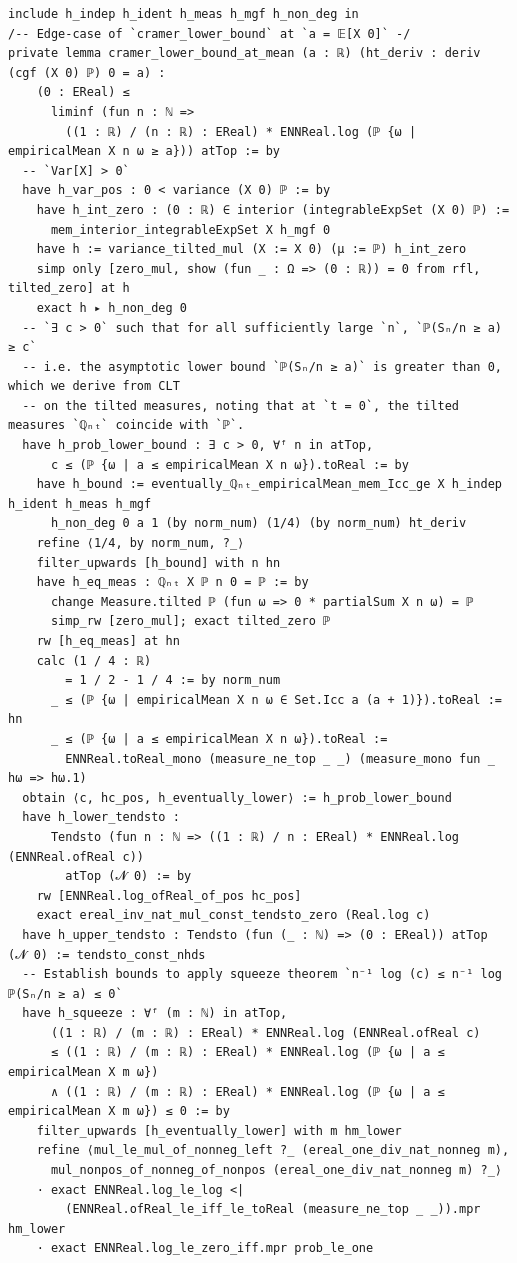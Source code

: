 \begin{lstlisting}
include h_indep h_ident h_meas h_mgf h_non_deg in
/-- Edge-case of `cramer_lower_bound` at `a = 𝔼[X 0]` -/
private lemma cramer_lower_bound_at_mean (a : ℝ) (ht_deriv : deriv (cgf (X 0) ℙ) 0 = a) :
    (0 : EReal) ≤
      liminf (fun n : ℕ =>
        ((1 : ℝ) / (n : ℝ) : EReal) * ENNReal.log (ℙ {ω | empiricalMean X n ω ≥ a})) atTop := by
  -- `Var[X] > 0`
  have h_var_pos : 0 < variance (X 0) ℙ := by
    have h_int_zero : (0 : ℝ) ∈ interior (integrableExpSet (X 0) ℙ) :=
      mem_interior_integrableExpSet X h_mgf 0
    have h := variance_tilted_mul (X := X 0) (μ := ℙ) h_int_zero
    simp only [zero_mul, show (fun _ : Ω => (0 : ℝ)) = 0 from rfl, tilted_zero] at h
    exact h ▸ h_non_deg 0
  -- `∃ c > 0` such that for all sufficiently large `n`, `ℙ(Sₙ/n ≥ a) ≥ c`
  -- i.e. the asymptotic lower bound `ℙ(Sₙ/n ≥ a)` is greater than 0, which we derive from CLT
  -- on the tilted measures, noting that at `t = 0`, the tilted measures `ℚₙₜ` coincide with `ℙ`.
  have h_prob_lower_bound : ∃ c > 0, ∀ᶠ n in atTop,
      c ≤ (ℙ {ω | a ≤ empiricalMean X n ω}).toReal := by
    have h_bound := eventually_ℚₙₜ_empiricalMean_mem_Icc_ge X h_indep h_ident h_meas h_mgf
      h_non_deg 0 a 1 (by norm_num) (1/4) (by norm_num) ht_deriv
    refine ⟨1/4, by norm_num, ?_⟩
    filter_upwards [h_bound] with n hn
    have h_eq_meas : ℚₙₜ X ℙ n 0 = ℙ := by
      change Measure.tilted ℙ (fun ω => 0 * partialSum X n ω) = ℙ
      simp_rw [zero_mul]; exact tilted_zero ℙ
    rw [h_eq_meas] at hn
    calc (1 / 4 : ℝ)
        = 1 / 2 - 1 / 4 := by norm_num
      _ ≤ (ℙ {ω | empiricalMean X n ω ∈ Set.Icc a (a + 1)}).toReal := hn
      _ ≤ (ℙ {ω | a ≤ empiricalMean X n ω}).toReal :=
        ENNReal.toReal_mono (measure_ne_top _ _) (measure_mono fun _ hω => hω.1)
  obtain ⟨c, hc_pos, h_eventually_lower⟩ := h_prob_lower_bound
  have h_lower_tendsto :
      Tendsto (fun n : ℕ => ((1 : ℝ) / n : EReal) * ENNReal.log (ENNReal.ofReal c))
        atTop (𝓝 0) := by
    rw [ENNReal.log_ofReal_of_pos hc_pos]
    exact ereal_inv_nat_mul_const_tendsto_zero (Real.log c)
  have h_upper_tendsto : Tendsto (fun (_ : ℕ) => (0 : EReal)) atTop (𝓝 0) := tendsto_const_nhds
  -- Establish bounds to apply squeeze theorem `n⁻¹ log (c) ≤ n⁻¹ log ℙ(Sₙ/n ≥ a) ≤ 0`
  have h_squeeze : ∀ᶠ (m : ℕ) in atTop,
      ((1 : ℝ) / (m : ℝ) : EReal) * ENNReal.log (ENNReal.ofReal c)
      ≤ ((1 : ℝ) / (m : ℝ) : EReal) * ENNReal.log (ℙ {ω | a ≤ empiricalMean X m ω})
      ∧ ((1 : ℝ) / (m : ℝ) : EReal) * ENNReal.log (ℙ {ω | a ≤ empiricalMean X m ω}) ≤ 0 := by
    filter_upwards [h_eventually_lower] with m hm_lower
    refine ⟨mul_le_mul_of_nonneg_left ?_ (ereal_one_div_nat_nonneg m),
      mul_nonpos_of_nonneg_of_nonpos (ereal_one_div_nat_nonneg m) ?_⟩
    · exact ENNReal.log_le_log <|
        (ENNReal.ofReal_le_iff_le_toReal (measure_ne_top _ _)).mpr hm_lower
    · exact ENNReal.log_le_zero_iff.mpr prob_le_one
\end{lstlisting}
